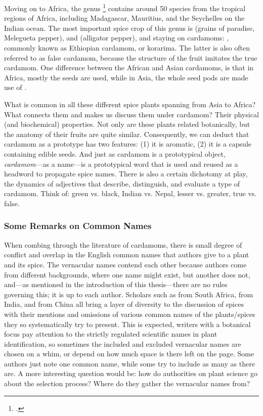 Moving on to Africa, the genus \footcite[Aframomum K.Schum. ]{gbif} contains around 50 species from the tropical regions of Africa, including Madagascar, Mauritius, and the Seychelles on the Indian ocean. The most important spice crop of this genus is  (grains of paradise, Melegueta pepper), and  (alligator pepper), and staying on cardamoms: , commonly known as Ethiopian cardamom, or korarima. The latter is also often referred to as false cardamom, because the structure of the fruit imitates the true cardamom. One difference between the African and Asian cardamoms, is that in Africa, mostly the seeds are used, while in Asia, the whole seed pods are made use of \autocite{van_wyk_culinary_2014}.



What is common in all these different spice plants spanning from Asia to Africa? What connects them and makes us discuss them under cardamom? Their physical (and biochemical) properties. Not only are these plants related botanically, but the anatomy of their fruits are quite similar. Consequently, we can deduct that cardamom as a prototype has two features: (1) it is aromatic, (2) it is a capsule containing edible seeds. And just as cardamom is a prototypical object, \textit{cardamom}---as a name---is a prototypical word that is used and reused as a headword to propagate spice names. There is also a certain dichotomy at play, the dynamics of adjectives that describe, distinguish, and evaluate a type of cardamom. Think of: green vs. black, Indian vs. Nepal, lesser vs. greater, true vs. false.

\subsubsection{Some Remarks on Common Names}

When combing through the literature of cardamoms, there is small degree of conflict and overlap in the English common names that authors give to a plant and its spice. The vernacular names contend each other because authors come from different backgrounds, where one name might exist, but another does not, and---as mentioned in the introduction of this thesis---there are no rules governing this; it is up to each author. Scholars such as \citeauthor{van_wyk_culinary_2014} from South Africa, \citeauthor{ravindran_cardamom_2002} from India, and \citeauthor{hu_food_2005} from China all bring a layer of diversity to the discussion of spices with their mentions and omissions of various common names of the plants/spices they so systematically try to present. This is expected, writers with a botanical focus pay attention to the strictly regulated scientific names in plant identification, so sometimes the included and excluded vernacular names are chosen on a whim, or depend on how much space is there left on the page. Some authors just note one common name, while some try to include as many as there are. A more interesting question would be: how do authorities on plant science go about the selection process? Where do they gather the vernacular names from?


